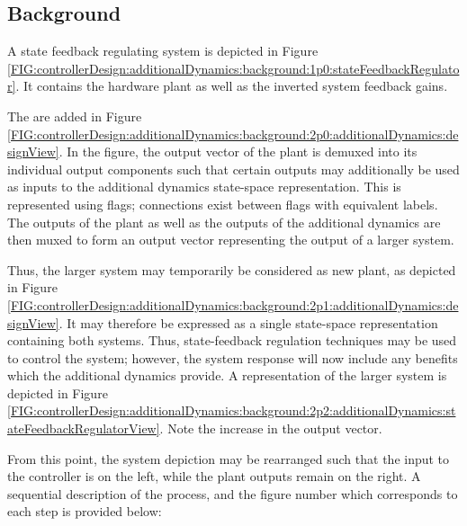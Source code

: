 \documentclass[crop=false,float=true,class=scrreprt]{standalone}
\begin{document}
\subsection{Background}
\label{SEC:controllerDesign:additionalDynamics:background}

A state feedback regulating system is depicted in Figure~%
\ref{FIG:controllerDesign:additionalDynamics:background:1p0:stateFeedbackRegulator}.
It contains the hardware plant as well as the inverted system feedback gains.

The  are added in Figure~%
\ref{FIG:controllerDesign:additionalDynamics:background:2p0:additionalDynamics:designView}.
In the figure, 
the output vector of the plant is demuxed into its individual output components 
such that certain outputs may additionally be used as 
inputs to the additional dynamics state-space representation.
This is represented using flags;
connections exist between flags with equivalent labels.
The outputs of the plant as well as 
the outputs of the additional dynamics 
are then muxed to form an output vector
representing the output of a larger system.

Thus, the larger system 
{}
may temporarily be considered as new plant,
as depicted in Figure~%
\ref{FIG:controllerDesign:additionalDynamics:background:2p1:additionalDynamics:designView}.
It may therefore be expressed as a single state-space representation containing both systems.
Thus, state-feedback regulation techniques may be used to control the system;
however, the system response will now include any benefits which the additional dynamics provide.
A representation of the larger system is depicted in Figure~%
\ref{FIG:controllerDesign:additionalDynamics:background:2p2:additionalDynamics:stateFeedbackRegulatorView}.
Note the increase in the output vector.

From this point,
the system depiction may be rearranged such that
the input to the controller is on the left, 
while the plant outputs remain on the right.
A sequential description of the process,
and the figure number which corresponds to each step 
is provided below:

\vspace*{+0em}
\end{document}
